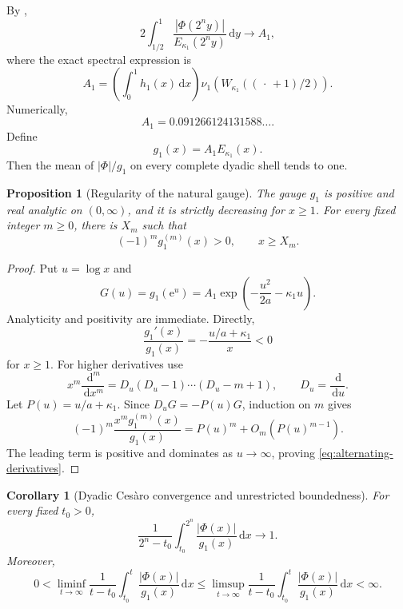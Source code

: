 \documentclass[11pt,oneside]{article}
\numberwithin{equation}{section}
\newtheorem{proposition}[theorem]{Proposition}
\newtheorem{corollary}[theorem]{Corollary}
\theoremstyle{definition}
\theoremstyle{remark}
\newcommand{\e}{\mathrm e}
\newcommand{\dd}{\,\mathrm d}
\newcommand{\abs}[1]{\left|#1\right|}
\newcommand{\PhiUp}{\Phi}
\begin{document}
By ,
\begin{equation}
 2\int_{1/2}^{1}
 \frac{\abs{\PhiUp(2^ny)}}{E_{\kappa_1}(2^ny)}\dd y
 \longrightarrow A_1,
 \label{eq:A1-limit}
\end{equation}
where the exact spectral expression is
\begin{equation}
 A_1=\left(\int_0^1h_1(x)\dd x\right)
 \nu_1\!\left(W_{\kappa_1}((\,\cdot\,+1)/2)\right).
 \label{eq:A1-exact}
\end{equation}
Numerically,
\begin{equation}
 A_1=0.091266124131588\ldots .
 \label{eq:A1-numeric}
\end{equation}
Define
\begin{equation}
 g_1(x)=A_1E_{\kappa_1}(x).
 \label{eq:g1}
\end{equation}
Then the mean of \(\abs{\PhiUp}/g_1\) on every complete dyadic shell tends to one.

\begin{proposition}[Regularity of the natural gauge]
\label{prop:g1-regularity}
The gauge \(g_1\) is positive and real analytic on \((0,\infty)\), and it is strictly
decreasing for \(x\ge1\).  For every fixed integer \(m\ge0\), there is \(X_m\) such that
\begin{equation}
 (-1)^mg_1^{(m)}(x)>0,
 \qquad x\ge X_m.
 \label{eq:alternating-derivatives}
\end{equation}
\end{proposition}

\begin{proof}
Put \(u=\log x\) and
\[
 G(u)=g_1(\e^u)=A_1\exp\!\left(-\frac{u^2}{2a}-\kappa_1u\right).
\]
Analyticity and positivity are immediate.  Directly,
\[
 \frac{g_1'(x)}{g_1(x)}=-\frac{u/a+\kappa_1}{x}<0
\]
for \(x\ge1\).  For higher derivatives use
\[
 x^m\frac{\dd^m}{\dd x^m}
 =D_u(D_u-1)\cdots(D_u-m+1),
 \qquad D_u=\frac{\dd}{\dd u}.
\]
Let \(P(u)=u/a+\kappa_1\).  Since \(D_uG=-P(u)G\), induction on \(m\) gives
\begin{equation}
 (-1)^m\frac{x^mg_1^{(m)}(x)}{g_1(x)}
 =P(u)^m+O_m(P(u)^{m-1}).
 \label{eq:derivative-asymptotic}
\end{equation}
The leading term is positive and dominates as \(u\to\infty\), proving
\eqref{eq:alternating-derivatives}.
\end{proof}

\begin{corollary}[Dyadic Ces\`aro convergence and unrestricted boundedness]
\label{cor:dyadic-Cesaro}
For every fixed \(t_0>0\),
\begin{equation}
 \frac1{2^n-t_0}\int_{t_0}^{2^n}
 \frac{\abs{\PhiUp(x)}}{g_1(x)}\dd x\longrightarrow1.
 \label{eq:dyadic-Cesaro}
\end{equation}
Moreover,
\begin{equation}
 0<\liminf_{t\to\infty}\frac1{t-t_0}\int_{t_0}^{t}
 \frac{\abs{\PhiUp(x)}}{g_1(x)}\dd x
 \le
 \limsup_{t\to\infty}\frac1{t-t_0}\int_{t_0}^{t}
 \frac{\abs{\PhiUp(x)}}{g_1(x)}\dd x<\infty.
 \label{eq:Cesaro-bounded}
\end{equation}
\end{corollary}
\end{document}
